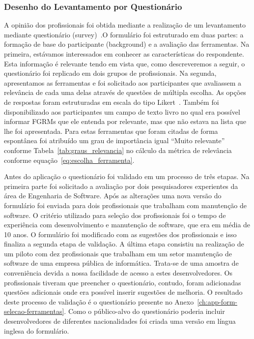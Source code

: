 \subsubsection{Desenho do Levantamento por Questionário}
\label{ssub:metodologia_desenho_da_pesquisa_com_profissionais}

A opinião dos profissionais foi obtida mediante a realização de um levantamento
mediante questionário (survey)~\cite{wohlin2012experimentation}.O formulário foi
estruturado em duas partes: a formação de base do participante (background) e a
avaliação das ferramentas. Na primeira, estávamos interessados em conhecer as
características do respondente. Esta informação é relevante tendo em vista que,
como descreveremos a seguir, o questionário foi replicado em dois grupos
de profissionais. Na segunda, apresentamos as ferramentas e foi
solicitado aos participantes que avaliassem a relevância de cada uma delas
através de questões de múltipla escolha. As opções de respostas foram
estruturadas em escala do tipo Likert~\cite{robbins2011plotting}. Também foi
disponibilizado aos participantes um campo de texto livro no qual era possível
informar FGRMs que ele entenda por relevante, mas que não estava na lista que
lhe foi apresentada. Para estas ferramentas que foram citadas de forma
espontânea foi atribuído um grau de importância igual ``Muito relevante''
conforme Tabela~\ref{tab:graus_relevancia} no cálculo da métrica de relevância
conforme equação~\ref{eq:escolha_ferramenta}.

Antes do aplicação o questionário foi validado em um processo de três etapas. Na
primeira parte foi solicitado a avaliação por dois pesquisadores experientes da
área de Engenharia de Software. Após as alterações uma nova versão do formulário
foi enviada para dois profissionais que trabalham com manutenção de software. O
critério utilizado para seleção dos profissionais foi o tempo de experiência com
desenvolvimento e manutenção de software, que era em média de 10 anos. O
formulário foi modificado com as sugestões dos profissionais e isso finaliza a
segunda etapa de validação. A última etapa consistiu na realização de um piloto
com dez profissionais que trabalham em um setor manutenção de software de uma
empresa pública de informática. Trata-se de uma amostra de conveniência devida a
nossa facilidade de acesso a estes desenvolvedores. Os profissionais tiveram que
preencher o questionário, contudo, foram adicionadas questões adicionais onde
era possível inserir sugestões de melhoria. O resultado deste processo de
validação é o questionário presente no
Anexo~\ref{ch:app-form-selecao-ferramentas}. Como o público-alvo do questionário
poderia incluir desenvolvedores de diferentes nacionalidades foi criada uma
versão em língua inglesa do formulário.

